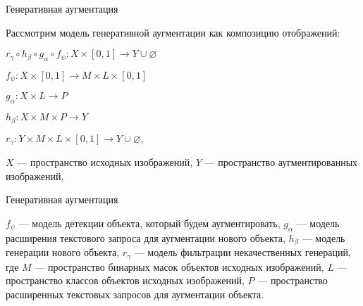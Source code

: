 \documentclass{beamer}
\begin{document}
\begin{frame}{Генеративная аугментация}

Рассмотрим модель генеративной аугментации как композицию отображений:

\begin{center}

$ r_{\gamma} \circ h_{\beta} \circ g_{\alpha} \circ f_{\psi}: X \times [0,1] \to Y \cup \varnothing$


\end{center}
\begin{center}
$ f_{\psi}: X \times [0,1] \to M \times L \times [0,1]$
\end{center}
\begin{center}
$ g_{\alpha}: X \times L \to P$
\end{center}
\begin{center}
$ h_{\beta}: X \times M \times P \to Y$

\end{center}
\begin{center}
$ r_{\gamma}: Y \times M \times L \times [0,1] \to Y \cup \varnothing,$

\end{center}



{$X$ — пространство исходных изображений,  
$Y$ — пространство аугментированных изображений,
}


\end{frame}

\begin{frame}{Генеративная аугментация}


{$f_{\psi}$ — модель детекции объекта, который будем аугментировать, $g_{\alpha}$ — модель расширения текстового запроса для аугментации нового объекта, $h_{\beta}$ — модель генерации нового объекта, $r_{\gamma}$ — модель фильтрации некачественных генераций, где $M$ — пространство бинарных масок объектов исходных изображений,  
$L$ — пространство классов объектов исходных изображений, $P$ — пространство расширенных текстовых запросов для аугментации объекта.
}


\end{frame}
\end{document}
